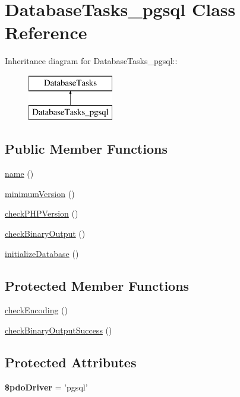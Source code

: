 \hypertarget{classDatabaseTasks__pgsql}{
\section{DatabaseTasks\_\-pgsql Class Reference}
\label{classDatabaseTasks__pgsql}
}
Inheritance diagram for DatabaseTasks\_\-pgsql::\begin{figure}[H]
\begin{center}
\leavevmode
\includegraphics[height=2cm]{classDatabaseTasks__pgsql}
\end{center}
\end{figure}
\subsection*{Public Member Functions}
\begin{DoxyCompactItemize}
\item 
\hyperlink{classDatabaseTasks__pgsql_afe779086f177b48b3441372136e2d560}{name} ()
\item 
\hyperlink{classDatabaseTasks__pgsql_abf42cc0a5aa01ae5c146277419f394ae}{minimumVersion} ()
\item 
\hyperlink{classDatabaseTasks__pgsql_a63fd0ad79a60d9a108492a18953cdaa4}{checkPHPVersion} ()
\item 
\hyperlink{classDatabaseTasks__pgsql_a01af0799725c2613f71ad1f9cf9bb898}{checkBinaryOutput} ()
\item 
\hyperlink{classDatabaseTasks__pgsql_aebebf924da7c07aee778afd5ddeef94e}{initializeDatabase} ()
\end{DoxyCompactItemize}
\subsection*{Protected Member Functions}
\begin{DoxyCompactItemize}
\item 
\hyperlink{classDatabaseTasks__pgsql_af2f3d31e7c5bfa05c06b248c836df3b1}{checkEncoding} ()
\item 
\hyperlink{classDatabaseTasks__pgsql_a03e035838c5fb114500d9f27719a8ab2}{checkBinaryOutputSuccess} ()
\end{DoxyCompactItemize}
\subsection*{Protected Attributes}
\begin{DoxyCompactItemize}
\item 
\hypertarget{classDatabaseTasks__pgsql_af771c3d1a89728cb8c280fe7641ba521}{
{\bfseries \$pdoDriver} = 'pgsql'}
\label{classDatabaseTasks__pgsql_af771c3d1a89728cb8c280fe7641ba521}

\end{DoxyCompactItemize}


